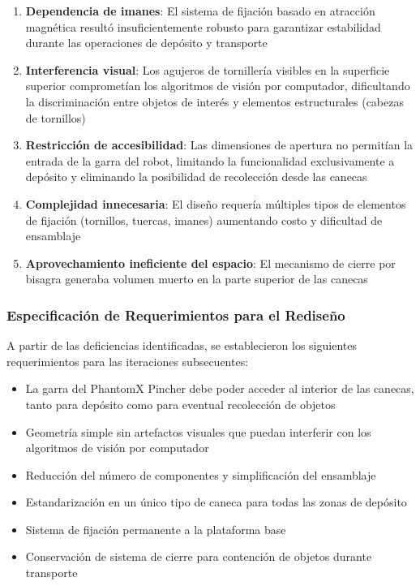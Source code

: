 \begin{enumerate}
    \item \textbf{Dependencia de imanes}: El sistema de fijación basado en atracción magnética resultó insuficientemente robusto para garantizar estabilidad durante las operaciones de depósito y transporte
    
    \item \textbf{Interferencia visual}: Los agujeros de tornillería visibles en la superficie superior comprometían los algoritmos de visión por computador, dificultando la discriminación entre objetos de interés y elementos estructurales (cabezas de tornillos)
    
    \item \textbf{Restricción de accesibilidad}: Las dimensiones de apertura no permitían la entrada de la garra del robot, limitando la funcionalidad exclusivamente a depósito y eliminando la posibilidad de recolección desde las canecas
    
    \item \textbf{Complejidad innecesaria}: El diseño requería múltiples tipos de elementos de fijación (tornillos, tuercas, imanes) aumentando costo y dificultad de ensamblaje
    
    \item \textbf{Aprovechamiento ineficiente del espacio}: El mecanismo de cierre por bisagra generaba volumen muerto en la parte superior de las canecas
\end{enumerate}

\subsubsection{Especificación de Requerimientos para el Rediseño}

A partir de las deficiencias identificadas, se establecieron los siguientes requerimientos para las iteraciones subsecuentes:

\begin{itemize}
    \item La garra del PhantomX Pincher debe poder acceder al interior de las canecas, tanto para depósito como para eventual recolección de objetos
    \item Geometría simple sin artefactos visuales que puedan interferir con los algoritmos de visión por computador
    \item Reducción del número de componentes y simplificación del ensamblaje
    \item Estandarización en un único tipo de caneca para todas las zonas de depósito
    \item Sistema de fijación permanente a la plataforma base
    \item Conservación de sistema de cierre para contención de objetos durante transporte
\end{itemize}

